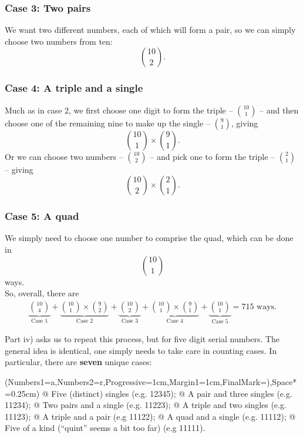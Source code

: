 \documentclass[a4paper,11pt]{article}
\begin{document}
\subsubsection*{Case 3: Two pairs}
We want two different numbers, each of which will form a pair, so we can simply choose two numbers from ten:
$$
\binom{10}{2}.
$$

\subsubsection*{Case 4: A triple and a single}
Much as in case 2, we first choose one digit to form the triple -- $\binom{10}{1}$ -- and then choose one of the remaining nine to make up the single -- $\binom{9}{1}$, giving
$$
\binom{10}{1}\times\binom{9}{1}.
$$
Or we can choose two numbers -- $\binom{10}{2}$ -- and pick one to form the triple -- $\binom{2}{1}$ -- giving 
$$
\binom{10}{2}\times\binom{2}{1}.
$$

\subsubsection*{Case 5: A quad}
We simply need to choose one number to comprise the quad, which can be done in 
$$
\binom{10}{1}
$$
ways.\\

\noindent So, overall, there are
\begin{align*}
\underbrace{\binom{10}{4}}_\text{Case 1} + \underbrace{\binom{10}{1}\times\binom{9}{2}}_\text{Case 2} + \underbrace{\binom{10}{2}}_\text{Case 3} + \underbrace{\binom{10}{1}\times\binom{9}{1}}_\text{Case 4} + \underbrace{\binom{10}{1}}_\text{Case 5} = 715\text{ ways.}
\end{align*}

Part iv) asks us to repeat this process, but for five digit serial numbers. The general idea is identical, one simply needs to take care in counting cases. In particular, there are \textbf{seven} unique cases:\\

\begin{easylist}[enumerate]
	\ListProperties(Numbers1=a,Numbers2=r,Progressive=1cm,Margin1=1cm,FinalMark={)},Space*=0.25cm)
	@ Five (distinct) singles (e.g. 12345);
	@ A pair and three singles (e.g. 11234);
	@ Two pairs and a single (e.g. 11223);
	@ A triple and two singles (e.g. 11123);
	@ A triple and a pair (e.g 11122);
	@ A quad and a single (e.g. 11112);
	@ Five of a kind (``quint'' seems a bit too far) (e.g 11111).
\end{easylist}
\end{document}
